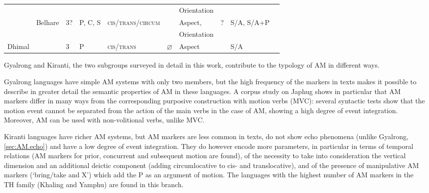 \documentclass[oneside,a4paper,11pt]{article}
\newcommand{\Y}{\Checkmark}
\newcommand{\N}{\XSolidBrush}
\begin{document}
\begin{table}[H]
{\begin{tabular}{llllllllll}
        &&&&&&Orientation&&\\
&Belhare & 3? & P, C, S  & \textsc{cis}/\textsc{trans}/\textsc{circum}  &  \Y & Aspect,  &?  &S/A, S/A+P \\
        &&&&&&Orientation&&\\
\midrule
Dhimal &&3 &P &\textsc{cis}/\textsc{trans}  &  $\varnothing$ & Aspect  &  \Y &S/A \\
\bottomrule
 \end{tabular}}
\end{table}

Gyalrong and Kiranti, the two subgroups surveyed in detail in this work, contribute to the typology of AM in different ways.

Gyalrong languages have simple AM systems with only two members, but the high frequency of the markers in texts makes it possible to describe in greater detail the semantic properties of AM in these languages. A corpus study on Japhug shows in particular that AM markers differ in many ways from the corresponding purposive construction with motion verbs (MVC): several syntactic tests show that the motion event cannot be separated from the action of the main verbs in the case of AM, showing a high degree of event integration. Moreover, AM can be used with non-volitional verbs, unlike MVC.

Kiranti languages have richer AM systems, but AM markers are less common in texts, do not show echo phenomena (unlike Gyalrong, \ref{sec:AM.echo}) and have a low degree of event integration. They do however encode more parameters, in particular in terms of temporal relations (AM markers for prior, concurrent and subsequent motion are found), of the necessity to take into consideration the vertical dimension and an additional deictic component (adding circumlocative to cis- and translocative), and of the presence of manipulative AM markers (`bring/take and X') which add the P as an argument of motion. The languages with the highest number of AM markers in the TH family (Khaling and Yamphu) are found in this branch.
\end{document}
